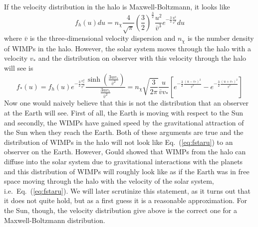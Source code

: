 \documentclass[a4paper,10pt,oneside]{book}
\begin{document}
If the velocity distribution in the halo is Maxwell-Boltzmann, it looks like
\begin{equation}
   f_h(u) du = n_\chi \frac{4}{\sqrt{\pi}} \left(\frac{3}{2}\right)^{\frac{3}{2}}
   \frac{u^2}{\bar{v}^3}
   e^{-\frac{3}{2}\frac{u^2}{\bar{v}^2}} du
\end{equation}
where $\bar{v}$ is the three-dimensional velocity dispersion and
$n_\chi$ is the number density of WIMPs in the halo. However, the
solar system moves through the halo with a velocity $v_*$ and the
distribution on observer with this velocity through the halo will see
is 
\begin{equation}
\label{eq:fstaru}
  f_*(u) = f_h(u) e^{-\frac{3}{2}\frac{v_*^2}{\bar{v}^2}} 
  \frac{\sinh\left(\frac{3 u v_*}{\bar{v}^2}\right)}{\frac{3 u v_*}{\bar{v}^2}} =
  n_\chi \sqrt{\frac{3}{2\pi}} \frac{u}{\bar{v} v_*} \left[
  e^{-\frac{3}{2} \frac{( u-v_*)^2}{\bar{v}^2}} -
  e^{-\frac{3}{2} \frac{( u+v_*)^2}{\bar{v}^2}} \right]
\end{equation}
Now one would naively believe that this is not the distribution that
an observer at the Earth will see. First of all, the Earth is moving
with respect to the Sun and secondly, the WIMPs have gained speed by
the gravitational attraction of the Sun when they reach the
Earth. Both of these arguments are true and the distribution of WIMPs
in the halo will not look like Eq.~(\ref{eq:fstaru}) to an observer on
the Earth. However, Gould \cite{Gould:1991aa} showed that WIMPs from the
halo can diffuse into the solar system due to gravitational
interactions with the planets and this distribution of WIMPs will
roughly look like as if the Earth was in free space moving through the
halo with the velocity of the solar system,
i.e.\ Eq.~(\ref{eq:fstaru}). We will later scrutinize this statement,
as it turns out that it does not quite hold, but 
as a first guess it is a reasonable approximation. For the Sun,
though, the velocity distribution give above is the correct one for a
Maxwell-Boltzmann distribution.
\end{document}
